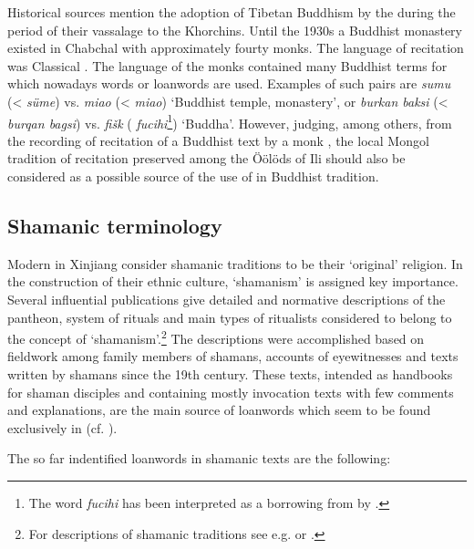 \documentclass[output=paper,colorlinks,citecolor=brown]{langscibook}
\begin{document}
Historical sources mention the adoption of Tibetan Buddhism by the  during the period of their vassalage to the Khorchins. Until the 1930s a Buddhist monastery existed in Chabchal with approximately fourty monks. The language of recitation was Classical . The language of the monks contained many  Buddhist terms for which nowadays  words or  loanwords are used. Examples of such pairs are \textit{sumu} (<  \textit{süme}) vs. \textit{miao} (<  \textit{miao}) ‘Buddhist temple, monastery’, or \textit{burkan baksi} (<  \textit{burqan bagsi}) vs. \textit{fišk} ( \textit{fucihi}\footnote{The  word \textit{fucihi} has been interpreted as a borrowing from  by \citet[259]{Vovin2006}.}) ‘Buddha’. However, judging, among others, from the recording of recitation of a Buddhist text by a  monk \citep{Zhuangsheng2018}, the local  Mongol tradition of  recitation preserved among the Öölöds of Ili should also be considered as a possible source of the use of  in  Buddhist tradition.

\subsection{Shamanic terminology}

Modern  in Xinjiang consider shamanic traditions to be their ‘original’ religion. In the construction of their ethnic culture, ‘shamanism’ is assigned key importance. Several influential publications give detailed and normative descriptions of the pantheon, system of rituals and main types of ritualists considered to belong to the concept of ‘shamanism’.\footnote{For descriptions of  shamanic traditions see e.g. \citet{Sárközi2013} or \citet{Harris2005}.} The descriptions were accomplished based on fieldwork among family members of shamans, accounts of eyewitnesses and texts written by shamans since the 19th century. These texts, intended as handbooks for shaman disciples and containing mostly invocation texts with few comments and explanations, are the main source of  loanwords which seem to be found exclusively in  (cf. \citealt{Zikmundová2013b}).

The so far indentified  loanwords in  shamanic texts are the following:
\end{document}
